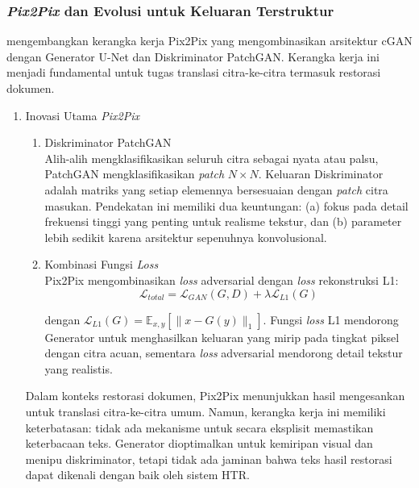 \documentclass[12pt,a4paper]{article}
\begin{document}
\subsubsection{\textit{Pix2Pix} dan Evolusi untuk Keluaran Terstruktur}
\label{subsubsec:pix2pix-evolution}


\textcite{isola2017} mengembangkan kerangka kerja Pix2Pix yang mengombinasikan arsitektur cGAN dengan Generator U-Net dan Diskriminator PatchGAN. Kerangka kerja ini menjadi fundamental untuk tugas translasi citra-ke-citra termasuk restorasi dokumen.

\begin{enumerate}[leftmargin=*, labelindent=0pt, itemsep=1ex, topsep=0pt]

\item Inovasi Utama \textit{Pix2Pix}
\label{para:pix2pix-inovasi}

\begin{enumerate}[leftmargin=1.5em, labelsep=0.5em, itemindent=0pt, noitemsep, topsep=0pt, label=\alph*.]
      \item Diskriminator PatchGAN \mbox{}\\[0.1em]
            Alih-alih mengklasifikasikan seluruh citra sebagai nyata atau palsu, PatchGAN mengklasifikasikan \textit{patch} $N \times N$. Keluaran Diskriminator adalah matriks yang setiap elemennya bersesuaian dengan \textit{patch} citra masukan. Pendekatan ini memiliki dua keuntungan: (a) fokus pada detail frekuensi tinggi yang penting untuk realisme tekstur, dan (b) parameter lebih sedikit karena arsitektur sepenuhnya konvolusional.

      \item Kombinasi Fungsi \textit{Loss} \mbox{}\\[0.1em]
            Pix2Pix mengombinasikan \textit{loss} adversarial dengan \textit{loss} rekonstruksi L1:
            \begin{equation}
                  \mathcal{L}_{total} = \mathcal{L}_{GAN}(G, D) + \lambda \mathcal{L}_{L1}(G)
            \end{equation}

            dengan $\mathcal{L}_{L1}(G) = \mathbb{E}_{x, y}[\|x - G(y)\|_1]$. Fungsi \textit{loss} L1 mendorong Generator untuk menghasilkan keluaran yang mirip pada tingkat piksel dengan citra acuan, sementara \textit{loss} adversarial mendorong detail tekstur yang realistis.
\end{enumerate}

Dalam konteks restorasi dokumen, Pix2Pix menunjukkan hasil mengesankan untuk translasi citra-ke-citra umum. Namun, kerangka kerja ini memiliki keterbatasan: tidak ada mekanisme untuk secara eksplisit memastikan keterbacaan teks. Generator dioptimalkan untuk kemiripan visual dan menipu diskriminator, tetapi tidak ada jaminan bahwa teks hasil restorasi dapat dikenali dengan baik oleh sistem HTR.

\end{enumerate}
\end{document}

